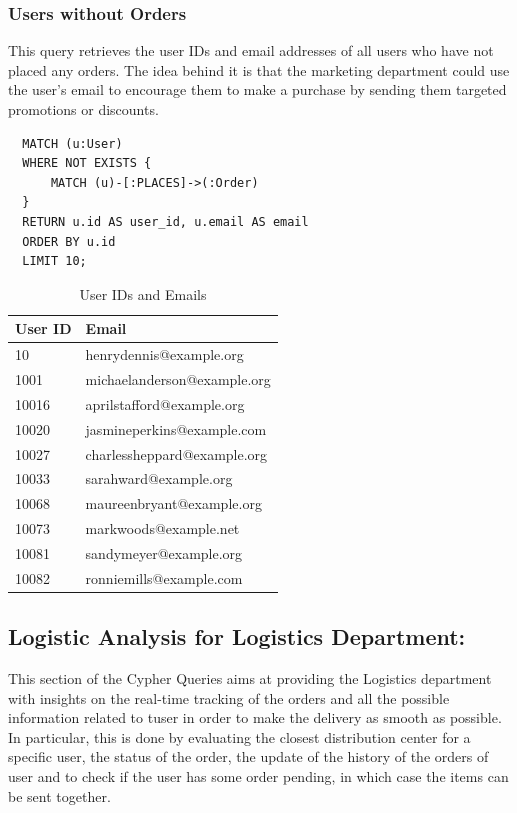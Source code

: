 \documentclass[a4paper,12pt]{article}
\begin{document}
\subsubsection{Users without Orders}
This query retrieves the user IDs and email addresses of all users who have not placed any orders. The idea behind it is that the marketing department could use the user's email to encourage them to make a purchase by sending them targeted promotions or discounts.
\begin{verbatim}
  MATCH (u:User)
  WHERE NOT EXISTS {
      MATCH (u)-[:PLACES]->(:Order)
  }
  RETURN u.id AS user_id, u.email AS email
  ORDER BY u.id
  LIMIT 10;
\end{verbatim}
\begin{table}[h!]
  \centering
  \caption{User IDs and Emails}
  \label{tab:user_ids_emails}
  \begin{tabular}{l l}
      \toprule
      \textbf{User ID} & \textbf{Email} \\
      \midrule
      10     & henrydennis@example.org       \\
      1001   & michaelanderson@example.org   \\
      10016  & aprilstafford@example.org     \\
      10020  & jasmineperkins@example.com    \\
      10027  & charlessheppard@example.org   \\
      10033  & sarahward@example.org         \\
      10068  & maureenbryant@example.org     \\
      10073  & markwoods@example.net         \\
      10081  & sandymeyer@example.org        \\
      10082  & ronniemills@example.com       \\
      \bottomrule
  \end{tabular}
\end{table}


\subsection{Logistic Analysis for Logistics Department:}
This section of the Cypher Queries aims at providing the Logistics department with insights on the real-time tracking of the orders and all the possible information related to tuser in order to make the delivery as smooth as possible.
In particular, this is done by evaluating the closest distribution center for a specific user, the status of the order, the update of the history of the orders of user and to check if the user has some order pending, in which case the items can be sent together. 
\end{document}
